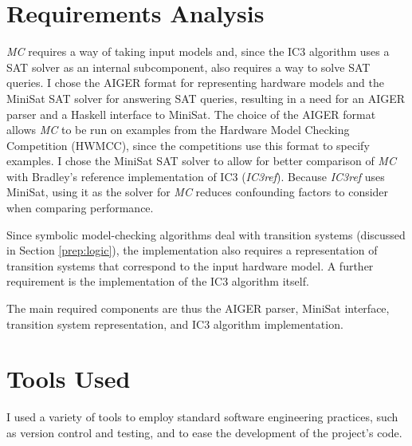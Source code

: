 \documentclass[12pt,a4paper,twoside,openright]{report}
\begin{document}
\section{Requirements Analysis}
\label{prep:requirements}


\emph{MC} requires a way of taking input models and, since
the IC3 algorithm uses a SAT solver as an internal subcomponent, also
requires a way to solve SAT queries.
I chose the AIGER format for representing hardware models and the
MiniSat SAT solver for answering SAT queries, resulting in a need for an
AIGER parser and a Haskell interface to MiniSat. The choice of
the AIGER format allows \emph{MC} to be run on examples from
the Hardware Model Checking Competition (HWMCC), since the competitions
use this format to specify examples. I chose the MiniSat SAT
solver to allow for better comparison of \emph{MC}
with Bradley's reference implementation of IC3 (\emph{IC3ref})\cite{refic3}.
Because \emph{IC3ref} uses MiniSat, using it as the solver
for \emph{MC} reduces confounding factors to consider when comparing performance.

Since symbolic model-checking algorithms deal with transition systems
(discussed in Section \ref{prep:logic}), the implementation also requires a representation of
transition systems that correspond to the input hardware model.
A further requirement is the implementation of the
IC3 algorithm itself.

The main required components are thus the AIGER parser, MiniSat interface,
transition system representation, and IC3 algorithm implementation.

\section{Tools Used}
\label{prep:tools}

I used a variety of tools to employ standard software engineering practices, such
as version control and testing, and to ease the development of
the project's code.
\end{document}
